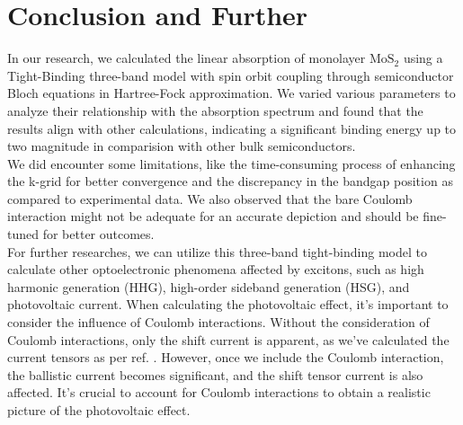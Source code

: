 \documentclass[12pt,english,a4paper]{article}
\begin{document}
\section{Conclusion and Further}
\quad In our research, we calculated the linear absorption of monolayer $\mathrm{MoS}_2$ using a Tight-Binding three-band model with spin orbit coupling through semiconductor Bloch equations in Hartree-Fock approximation. We varied various parameters to analyze their relationship with the absorption spectrum and found that the results align with other calculations, indicating a significant binding energy up to two magnitude in comparision with other bulk semiconductors.\\\null
\quad We did encounter some limitations, like the time-consuming process of enhancing the k-grid for better convergence and the discrepancy in the bandgap position as compared to experimental data. We also observed that the bare Coulomb interaction might not be adequate for an accurate depiction and should be fine-tuned for better outcomes.\\\null
\quad For further researches, we can utilize this three-band tight-binding model to calculate other optoelectronic phenomena affected by excitons, such as high harmonic generation (HHG), high-order sideband generation (HSG), and photovoltaic current. When calculating the photovoltaic effect, it's important to consider the influence of Coulomb interactions. Without the consideration of Coulomb interactions, only the shift current is apparent, as we've calculated the current tensors as per ref. \cite{vo_calculation_2024}. However, once we include the Coulomb interaction, the ballistic current becomes significant, and the shift tensor current is also affected. It's crucial to account for Coulomb interactions to obtain a realistic picture of the photovoltaic effect.
\newpage


\newpage
{}
\end{document}
